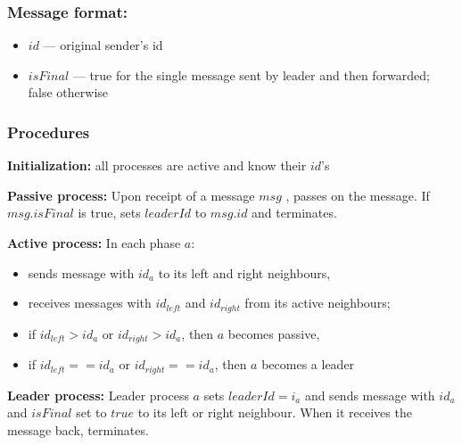 \documentclass{article}
\begin{document}
\subsubsection*{Message format:}
\begin{itemize}
    \item $id$ --- original sender's id
    \item $isFinal$ --- true for the single message sent by leader and then forwarded; false otherwise
\end{itemize}

\subsubsection*{Procedures}
\textbf{Initialization:} all processes are active and know their $id$'s

\textbf{Passive process:} Upon receipt of a message $msg$ , passes on the message. If $msg.isFinal$ is true, sets $leaderId$ to $msg.id$ and terminates.

\textbf{Active process:} In each phase $a$:
\begin{itemize}
    \item sends message with $id_a$ to its left and right neighbours,
    \item receives messages with $id_{left}$ and $id_{right}$ from its active neighbours;
    \item if $id_{left}>id_a$ or $id_{right}>id_a$, then $a$ becomes passive,
    \item if $id_{left}==id_a$ or $id_{right}==id_a$, then $a$ becomes a leader
\end{itemize}

\textbf{Leader process:} Leader process $a$ sets $leaderId = i_a$ and sends message with $id_a$ and $isFinal$ set to $true$ to its left or right neighbour. When it receives the message back, terminates.

\clearpage
\end{document}
